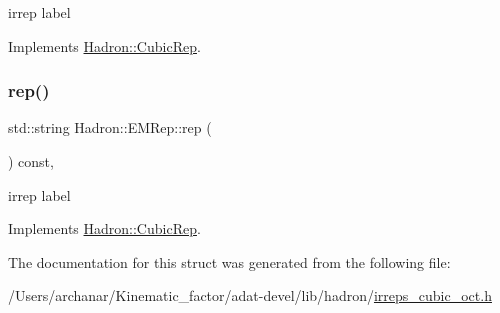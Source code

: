 irrep label 

Implements \mbox{\hyperlink{structHadron_1_1CubicRep_ac3eb63608803d44c68681f158e14eb1b}{Hadron\+::\+Cubic\+Rep}}.

\mbox{\label{structHadron_1_1EMRep_a38de805af0f4c022d2b7f70ac03c62ce}} 
\subsubsection{\texorpdfstring{rep()}{rep()}\hspace{0.1cm}{\footnotesize\ttfamily [3/3]}}
{\footnotesize\ttfamily std\+::string Hadron\+::\+E\+M\+Rep\+::rep (\begin{DoxyParamCaption}{ }\end{DoxyParamCaption}) const\hspace{0.3cm}{\ttfamily [inline]}, {\ttfamily [virtual]}}

irrep label 

Implements \mbox{\hyperlink{structHadron_1_1CubicRep_ac3eb63608803d44c68681f158e14eb1b}{Hadron\+::\+Cubic\+Rep}}.



The documentation for this struct was generated from the following file\+:\begin{DoxyCompactItemize}
\item 
/\+Users/archanar/\+Kinematic\+\_\+factor/adat-\/devel/lib/hadron/\mbox{\hyperlink{adat-devel_2lib_2hadron_2irreps__cubic__oct_8h}{irreps\+\_\+cubic\+\_\+oct.\+h}}\end{DoxyCompactItemize}
